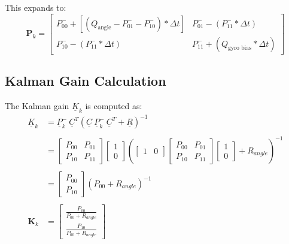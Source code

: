 \begin{appendices}
This expands to:
\begin{equation}
	\mathbf{P}_k = \begin{bmatrix} P_{00}^- + [(Q_{\text{angle}} - P_{01}^- - P_{10}^-)*\Delta t]  &  P_{01}^- - (P_{11}^-*\Delta t)  
		\\ P_{10}^- - (P_{11}^-*\Delta t)  &  P_{11}^- + (Q_{\text{gyro bias}}*\Delta t) \end{bmatrix}  \label{eq:eq}
\end{equation}


\subsection{Kalman Gain Calculation}
The Kalman gain $\underline{K}_{k}$ is computed as:
\begin{equation}
	\begin{aligned}
		\underline{K}_{k} &= \underline{P}_{k}^- \ \underline{C}^T ( \underline{C} \ \underline{P}_{k}^-\ \underline{C}^T  +\underline{R})^{-1} \\
		\\
		&= 
		\begin{bmatrix} P_{00} & P_{01} \\ P_{10} & P_{11} \end{bmatrix} \begin{bmatrix} 1 \\ 0 \end{bmatrix}
		\left(
		\begin{bmatrix} 1 & 0 \end{bmatrix} 
		\begin{bmatrix} P_{00} & P_{01} \\ P_{10} & P_{11} \end{bmatrix}  
		\begin{bmatrix} 1 \\ 0 \end{bmatrix} 
		+ R_{angle}
		\right)^{-1} \\ \\
		&= 
		\begin{bmatrix} P_{00} \\ P_{10}\end{bmatrix}
		\left(
		P_{00}  
		+ R_{angle}
		\right)^{-1} \\ \\
		\mathbf{K}_k &= \begin{bmatrix} \frac{ P_{00} }{ P_{00}  
				+ R_{angle}} \\ \frac{ P_{10} }{ P_{00}  
				+ R_{angle}} \end{bmatrix}
	\end{aligned}  \label{eq:eq}
\end{equation}


\end{appendices}
